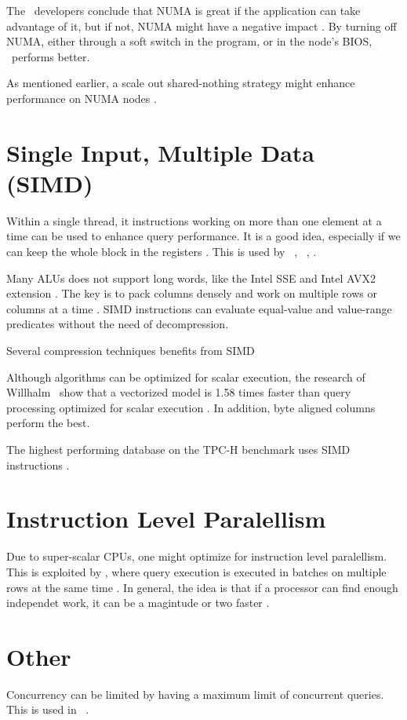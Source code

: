 The \qlikview~developers conclude that NUMA is great if the application can take advantage of it, but if not, NUMA might have a negative impact \cite{Qlik2013-an}. By turning off NUMA, either through a soft switch in the program, or in the node's BIOS, \qlikview~performs better.

As mentioned earlier, a scale out shared-nothing strategy might enhance performance on NUMA nodes \cite{Mukherjee2015-ul}.

\section{Single Input, Multiple Data (SIMD)}
\label{sec:Single Input, Multiple Instructions (SIMD)}
Within a single thread, it instructions working on more than one element at a time can be used to enhance query performance. It is a good idea, especially if we can keep the whole block in the registers \cite{Neumann2011-uq}. This is used by \oracle~\cite{Lahiri2015-mz}, \blink~\cite{Barber2012-xt}, \ibm.

Many ALUs does not support long words, like the Intel SSE and Intel AVX2 extension \cite{Willhalm2009-hu, Willhalm2013-rl}. The key is to pack columns densely and work on multiple rows or columns at a time \cite{Johnson2008-cp}. SIMD instructions can evaluate equal-value and value-range predicates without the need of decompression.

Several compression techniques benefits from SIMD \cite{Lemke2010-is}

Although algorithms can be optimized for scalar execution, the research of Willhalm \ea~show that a vectorized model is 1.58 times faster than query processing optimized for scalar execution \cite{Willhalm2009-hu}. In addition, byte aligned columns perform the best.

The highest performing database on the TPC-H benchmark uses SIMD instructions \cite{Exasol2014-xh}.

\section{Instruction Level Paralellism}
\label{sec:Instruction Level Paralellism}
Due to super-scalar CPUs, one might optimize for instruction level paralellism. This is exploited by \blink, where query execution is executed in batches on multiple rows at the same time \cite{Johnson2008-cp}. In general, the idea is that if a processor can find enough independet work, it can be a magintude or two faster \cite{Boncz2005-wj}.

\section{Other}
\label{sec:Other}
Concurrency can be limited by having a maximum limit of concurrent queries. This is used in \ibm~\cite{Raman2013-em}.
